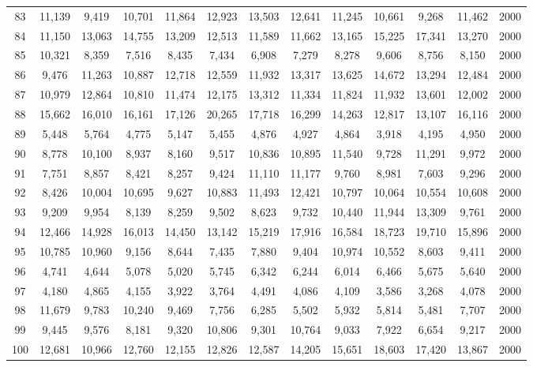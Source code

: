 {\begin{longtable}{ >{\footnotesize}ccccccccccccc}
83  & 11,139 & 9,419  & 10,701 & 11,864 & 12,923 & 13,503 & 12,641 & 11,245 & 10,661 & 9,268  & 11,462 & 2000 \\
84  & 11,150 & 13,063 & 14,755 & 13,209 & 12,513 & 11,589 & 11,662 & 13,165 & 15,225 & 17,341 & 13,270 & 2000 \\
85  & 10,321 & 8,359  & 7,516  & 8,435  & 7,434  & 6,908  & 7,279  & 8,278  & 9,606  & 8,756  & 8,150  & 2000 \\
86  & 9,476  & 11,263 & 10,887 & 12,718 & 12,559 & 11,932 & 13,317 & 13,625 & 14,672 & 13,294 & 12,484 & 2000 \\
87  & 10,979 & 12,864 & 10,810 & 11,474 & 12,175 & 13,312 & 11,334 & 11,824 & 11,932 & 13,601 & 12,002 & 2000 \\
88  & 15,662 & 16,010 & 16,161 & 17,126 & 20,265 & 17,718 & 16,299 & 14,263 & 12,817 & 13,107 & 16,116 & 2000 \\
89  & 5,448  & 5,764  & 4,775  & 5,147  & 5,455  & 4,876  & 4,927  & 4,864  & 3,918  & 4,195  & 4,950  & 2000 \\
90  & 8,778  & 10,100 & 8,937  & 8,160  & 9,517  & 10,836 & 10,895 & 11,540 & 9,728  & 11,291 & 9,972  & 2000 \\
91  & 7,751  & 8,857  & 8,421  & 8,257  & 9,424  & 11,110 & 11,177 & 9,760  & 8,981  & 7,603  & 9,296  & 2000 \\
92  & 8,426  & 10,004 & 10,695 & 9,627  & 10,883 & 11,493 & 12,421 & 10,797 & 10,064 & 10,554 & 10,608 & 2000 \\
93  & 9,209  & 9,954  & 8,139  & 8,259  & 9,502  & 8,623  & 9,732  & 10,440 & 11,944 & 13,309 & 9,761  & 2000 \\
94  & 12,466 & 14,928 & 16,013 & 14,450 & 13,142 & 15,219 & 17,916 & 16,584 & 18,723 & 19,710 & 15,896 & 2000 \\
95  & 10,785 & 10,960 & 9,156  & 8,644  & 7,435  & 7,880  & 9,404  & 10,974 & 10,552 & 8,603  & 9,411  & 2000 \\
96  & 4,741  & 4,644  & 5,078  & 5,020  & 5,745  & 6,342  & 6,244  & 6,014  & 6,466  & 5,675  & 5,640  & 2000 \\
97  & 4,180  & 4,865  & 4,155  & 3,922  & 3,764  & 4,491  & 4,086  & 4,109  & 3,586  & 3,268  & 4,078  & 2000 \\
98  & 11,679 & 9,783  & 10,240 & 9,469  & 7,756  & 6,285  & 5,502  & 5,932  & 5,814  & 5,481  & 7,707  & 2000 \\
99  & 9,445  & 9,576  & 8,181  & 9,320  & 10,806 & 9,301  & 10,764 & 9,033  & 7,922  & 6,654  & 9,217  & 2000 \\
100 & 12,681 & 10,966 & 12,760 & 12,155 & 12,826 & 12,587 & 14,205 & 15,651 & 18,603 & 17,420 & 13,867 & 2000  \\ \hline
\end{longtable}
}
